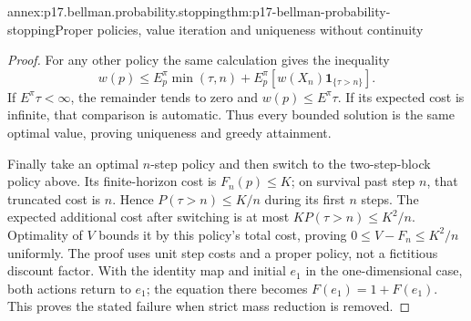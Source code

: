 \begin{annexitem}{annex:p17.bellman.probability.stopping}{thm:p17-bellman-probability-stopping}{Proper policies, value iteration and uniqueness without continuity}
\begin{proof}
For any other policy the same
calculation gives the inequality
\[
 w(p)\leq E_p^\pi\min(\tau,n)
              +E_p^\pi[w(X_n)\mathbf1_{\{\tau>n\}}].
\]
If \(E^\pi\tau<\infty\), the
remainder tends to zero and
\(w(p)\leq E^\pi\tau\).
If its expected cost is infinite,
that comparison is automatic.
Thus every bounded solution is
the same optimal value, proving
uniqueness and greedy attainment.

Finally take an optimal \(n\)-step
policy and then switch to the
two-step-block policy above.
Its finite-horizon cost is \(F_n(p)\leq K\);
on survival past step \(n\), that
truncated cost is \(n\). Hence
\(P(\tau>n)\leq K/n\) during its
first \(n\) steps.
The expected additional cost
after switching is at most
\(K P(\tau>n)\leq K^2/n\).
Optimality of \(V\) bounds it by
this policy's total cost, proving
\(0\leq V-F_n\leq K^2/n\)
uniformly. The proof uses unit
step costs and a proper policy,
not a fictitious discount factor.
With the identity map and initial \(e_1\) in
the one-dimensional case, both actions return
to \(e_1\); the equation there becomes
\(F(e_1)=1+F(e_1)\). This proves the stated
failure when strict mass reduction is removed.
\end{proof}
\end{annexitem}

